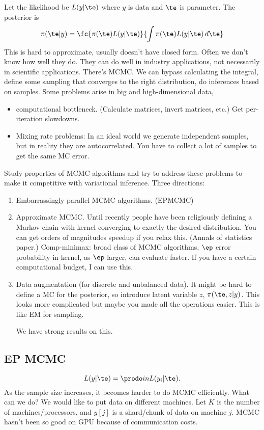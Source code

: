 Let the likelihood be $L(y|\te)$ where $y$ is data and $\te$ is parameter.
The posterior is
$$
\pi(\te|y) = \fc{\pi(\te) L(y|\te)}{\int \pi(\te)L(y|\te)\,d\te}
$$
This is hard to approximate, usually doesn't have closed form. Often we don't know how well they do. They can do well in industry applications, not necessarily in scientific applications.
There's MCMC. We can bypass calculating the integral, define some sampling that converges to the right distribution, do inferences based on samples.
Some problems arise in big and high-dimensional data,
\begin{itemize}
\item
computational bottleneck. (Calculate matrices, invert matrices, etc.) Get per-iteration slowdowns.
\item
Mixing rate problems: In an ideal world we generate independent samples, but in reality they are autocorrelated. You have to collect a lot of samples to get the same MC error.
\end{itemize}
Study properties of MCMC algorithms and try to address these problems to make it competitive with variational inference. 
Three directions:
\begin{enumerate}
\item
Embarrassingly parallel MCMC algorithms. (EPMCMC)
\item
Approximate MCMC. Until recently people have been religiously defining a Markov chain with kernel converging to exactly the desired distribution. You can get orders of magnitudes speedup if you relax this. 
(Annals of statistics paper.)
Comp-minimax: broad class of MCMC algorithms, $\ep$ error probability in kernel, as $\ep$ larger, can evaluate faster. If you have a certain computational budget, I can use this.
\item
Data augmentation (for discrete and unbalanced data). It might be hard to define a MC for the posterior, so introduce latent variable $z$, $\pi(\te, z|y)$. This looks more complicated but maybe you made all the operations easier. This is like EM for sampling.

We have strong results on this.
\end{enumerate}

\subsection{EP MCMC}
$$L(y|\te) = \prodo in L(y_i|\te).$$
As the sample size increases, it becomes harder to do MCMC efficiently. What can we do? We would like to put data on different machines. 
Let $K$ is the number of machines/processors, and $y[j]$ is a shard/chunk of data on machine $j$. MCMC hasn't been so good on GPU because of communication costs.

